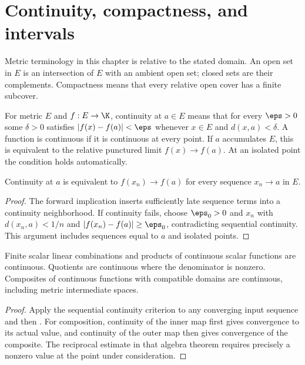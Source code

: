 \chapter{Continuity, compactness, and intervals}
Metric terminology in this chapter is relative to the stated domain. An open set in $E$ is an intersection of $E$ with an ambient open set; closed sets are their complements. Compactness means that every relative open cover has a finite subcover.

\begin{definition}
For metric $E$ and $f:E\to\K$, continuity at $a\in E$ means that for every $\eps>0$ some $\delta>0$ satisfies $|f(x)-f(a)|<\eps$ whenever $x\in E$ and $d(x,a)<\delta$. A function is continuous if it is continuous at every point. If $a$ accumulates $E$, this is equivalent to the relative punctured limit $f(x)\to f(a)$. At an isolated point the condition holds automatically.
\end{definition}
\begin{proposition}
Continuity at $a$ is equivalent to $f(x_n)\to f(a)$ for every sequence $x_n\to a$ in $E$.
\end{proposition}
\begin{proof}
The forward implication inserts sufficiently late sequence terms into a continuity neighborhood. If continuity fails, choose $\eps_0>0$ and $x_n$ with $d(x_n,a)<1/n$ and $|f(x_n)-f(a)|\ge\eps_0$, contradicting sequential continuity. This argument includes sequences equal to $a$ and isolated points.
\end{proof}

\begin{proposition}
Finite scalar linear combinations and products of continuous scalar functions are continuous. Quotients are continuous where the denominator is nonzero. Composites of continuous functions with compatible domains are continuous, including metric intermediate spaces.
\end{proposition}
\begin{proof}
Apply the sequential continuity criterion to any converging input sequence and then . For composition, continuity of the inner map first gives convergence to its actual value, and continuity of the outer map then gives convergence of the composite. The reciprocal estimate in that algebra theorem requires precisely a nonzero value at the point under consideration.
\end{proof}

